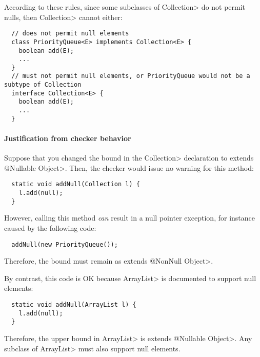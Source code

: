 According to these rules, since some subclasses of \<Collection> do not
permit nulls, then \<Collection> cannot either:

\begin{Verbatim}
  // does not permit null elements
  class PriorityQueue<E> implements Collection<E> {
    boolean add(E);
    ...
  }
  // must not permit null elements, or PriorityQueue would not be a subtype of Collection
  interface Collection<E> {
    boolean add(E);    
    ...
  }
\end{Verbatim}


\paragraph{Justification from checker behavior}

Suppose that you changed the bound in the \<Collection> declaration to
\<extends @Nullable Object>.  Then, the checker would issue no warning for
this method:

\begin{Verbatim}
  static void addNull(Collection l) {
    l.add(null);
  }
\end{Verbatim}

\noindent
However, calling this method \emph{can} result in a null pointer exception,
for instance caused by the following code:

\begin{Verbatim}
  addNull(new PriorityQueue());
\end{Verbatim}

\noindent
Therefore, the bound must remain as \<extends @NonNull Object>.

By contrast, this code is OK because \<ArrayList> is documented to support
null elements:

\begin{Verbatim}
  static void addNull(ArrayList l) {
    l.add(null);
  }
\end{Verbatim}

\noindent
Therefore, the upper bound in \<ArrayList> is \<extends @Nullable Object>.
Any subclass of \<ArrayList> must also support null elements.





